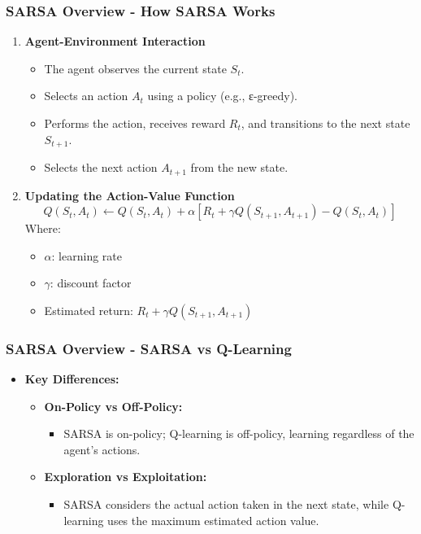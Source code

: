 \documentclass[aspectratio=169]{beamer}
\begin{document}
\begin{frame}[fragile]
    \frametitle{SARSA Overview - How SARSA Works}
    \begin{enumerate}
        \item \textbf{Agent-Environment Interaction}
        \begin{itemize}
            \item The agent observes the current state \( S_t \).
            \item Selects an action \( A_t \) using a policy (e.g., ε-greedy).
            \item Performs the action, receives reward \( R_t \), and transitions to the next state \( S_{t+1} \).
            \item Selects the next action \( A_{t+1} \) from the new state.
        \end{itemize}
        
        \item \textbf{Updating the Action-Value Function}
        \begin{equation}
        Q(S_t, A_t) \leftarrow Q(S_t, A_t) + \alpha \left[ R_t + \gamma Q(S_{t+1}, A_{t+1}) - Q(S_t, A_t) \right]
        \end{equation}
        Where:
        \begin{itemize}
            \item \( \alpha \): learning rate
            \item \( \gamma \): discount factor
            \item Estimated return: \( R_t + \gamma Q(S_{t+1}, A_{t+1}) \)
        \end{itemize}
    \end{enumerate}
\end{frame}

\begin{frame}[fragile]
    \frametitle{SARSA Overview - SARSA vs Q-Learning}
    \begin{itemize}
        \item \textbf{Key Differences:}
        \begin{itemize}
            \item \textbf{On-Policy vs Off-Policy:} 
            \begin{itemize}
                \item SARSA is on-policy; Q-learning is off-policy, learning regardless of the agent's actions.
            \end{itemize}
            \item \textbf{Exploration vs Exploitation:}
            \begin{itemize}
                \item SARSA considers the actual action taken in the next state, while Q-learning uses the maximum estimated action value.
            \end{itemize}
        \end{itemize}
    \end{itemize}
\end{frame}
\end{document}

